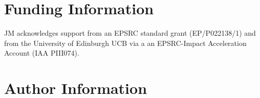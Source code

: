 \documentclass[9pt,tutorial]{livecoms}
\begin{document}
\section{Funding Information}
JM acknowledges support from an EPSRC standard grant (EP/P022138/1) and from the University of Edinburgh UCB via a an EPSRC-Impact Acceleration Account (IAA PIII074).

\section*{Author Information}
\makeorcid




\end{document}
